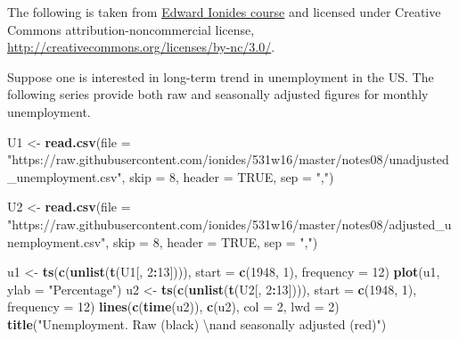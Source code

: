 \documentclass[]{book}
\newenvironment{Shaded}{\begin{snugshade}}{\end{snugshade}}
\newcommand{\KeywordTok}[1]{\textcolor[rgb]{0.13,0.29,0.53}{\textbf{#1}}}
\newcommand{\DataTypeTok}[1]{\textcolor[rgb]{0.13,0.29,0.53}{#1}}
\newcommand{\DecValTok}[1]{\textcolor[rgb]{0.00,0.00,0.81}{#1}}
\newcommand{\CharTok}[1]{\textcolor[rgb]{0.31,0.60,0.02}{#1}}
\newcommand{\StringTok}[1]{\textcolor[rgb]{0.31,0.60,0.02}{#1}}
\newcommand{\OtherTok}[1]{\textcolor[rgb]{0.56,0.35,0.01}{#1}}
\newcommand{\OperatorTok}[1]{\textcolor[rgb]{0.81,0.36,0.00}{\textbf{#1}}}
\newcommand{\NormalTok}[1]{#1}
\begin{document}
The following is taken from
\href{http://ionides.github.io/531w16/notes08/notes8.html}{Edward
Ionides course} and licensed under Creative Commons
attribution-noncommercial license,
\url{http://creativecommons.org/licenses/by-nc/3.0/}.

Suppose one is interested in long-term trend in unemployment in the US.
The following series provide both raw and seasonally adjusted figures
for monthly unemployment.

\begin{Shaded}
\begin{Highlighting}[]
\NormalTok{U1 <-}\StringTok{ }\KeywordTok{read.csv}\NormalTok{(}\DataTypeTok{file =} \StringTok{"https://raw.githubusercontent.com/ionides/531w16/master/notes08/unadjusted_unemployment.csv"}\NormalTok{, }
    \DataTypeTok{skip =} \DecValTok{8}\NormalTok{, }\DataTypeTok{header =} \OtherTok{TRUE}\NormalTok{, }\DataTypeTok{sep =} \StringTok{","}\NormalTok{)}

\NormalTok{U2 <-}\StringTok{ }\KeywordTok{read.csv}\NormalTok{(}\DataTypeTok{file =} \StringTok{"https://raw.githubusercontent.com/ionides/531w16/master/notes08/adjusted_unemployment.csv"}\NormalTok{, }
    \DataTypeTok{skip =} \DecValTok{8}\NormalTok{, }\DataTypeTok{header =} \OtherTok{TRUE}\NormalTok{, }\DataTypeTok{sep =} \StringTok{","}\NormalTok{)}

\NormalTok{u1 <-}\StringTok{ }\KeywordTok{ts}\NormalTok{(}\KeywordTok{c}\NormalTok{(}\KeywordTok{unlist}\NormalTok{(}\KeywordTok{t}\NormalTok{(U1[, }\DecValTok{2}\OperatorTok{:}\DecValTok{13}\NormalTok{]))), }\DataTypeTok{start =} \KeywordTok{c}\NormalTok{(}\DecValTok{1948}\NormalTok{, }\DecValTok{1}\NormalTok{), }\DataTypeTok{frequency =} \DecValTok{12}\NormalTok{)}
\KeywordTok{plot}\NormalTok{(u1, }\DataTypeTok{ylab =} \StringTok{"Percentage"}\NormalTok{)}
\NormalTok{u2 <-}\StringTok{ }\KeywordTok{ts}\NormalTok{(}\KeywordTok{c}\NormalTok{(}\KeywordTok{unlist}\NormalTok{(}\KeywordTok{t}\NormalTok{(U2[, }\DecValTok{2}\OperatorTok{:}\DecValTok{13}\NormalTok{]))), }\DataTypeTok{start =} \KeywordTok{c}\NormalTok{(}\DecValTok{1948}\NormalTok{, }\DecValTok{1}\NormalTok{), }\DataTypeTok{frequency =} \DecValTok{12}\NormalTok{)}
\KeywordTok{lines}\NormalTok{(}\KeywordTok{c}\NormalTok{(}\KeywordTok{time}\NormalTok{(u2)), }\KeywordTok{c}\NormalTok{(u2), }\DataTypeTok{col =} \DecValTok{2}\NormalTok{, }\DataTypeTok{lwd =} \DecValTok{2}\NormalTok{)}
\KeywordTok{title}\NormalTok{(}\StringTok{"Unemployment. Raw (black) }\CharTok{\textbackslash{}n}\StringTok{and seasonally adjusted (red)"}\NormalTok{)}
\end{Highlighting}
\end{Shaded}
\end{document}
